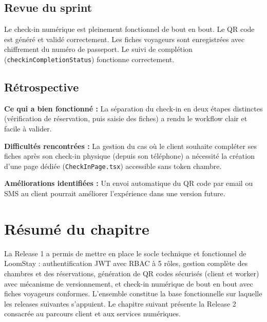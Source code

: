 \subsection{Revue du sprint}

Le check-in numérique est pleinement fonctionnel de bout en bout. Le QR code est généré et validé correctement. Les fiches voyageurs sont enregistrées avec chiffrement du numéro de passeport. Le suivi de complétion (\texttt{checkinCompletionStatus}) fonctionne correctement.

\subsection{Rétrospective}

\textbf{Ce qui a bien fonctionné :} La séparation du check-in en deux étapes distinctes (vérification de réservation, puis saisie des fiches) a rendu le workflow clair et facile à valider.

\textbf{Difficultés rencontrées :} La gestion du cas où le client souhaite compléter ses fiches après son check-in physique (depuis son téléphone) a nécessité la création d'une page dédiée (\texttt{CheckInPage.tsx}) accessible sans token chambre.

\textbf{Améliorations identifiées :} Un envoi automatique du QR code par email ou SMS au client pourrait améliorer l'expérience dans une version future.

\section*{Résumé du chapitre}

La Release 1 a permis de mettre en place le socle technique et fonctionnel de LoomStay : authentification JWT avec RBAC à 5 rôles, gestion complète des chambres et des réservations, génération de QR codes sécurisés (client et worker) avec mécanisme de versionnement, et check-in numérique de bout en bout avec fiches voyageurs conformes. L'ensemble constitue la base fonctionnelle sur laquelle les releases suivantes s'appuient. Le chapitre suivant présente la Release 2 consacrée au parcours client et aux services numériques.
